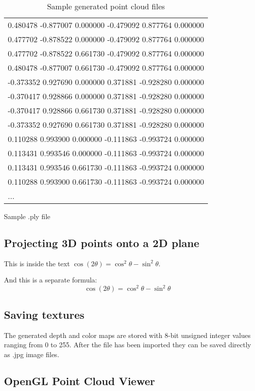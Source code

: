 \begin{table}[h]
\begin{subtable}[b]{0.52\textwidth}
{\begin{tabular}{l}
			0.480478 -0.877007 0.000000 -0.479092 0.877764 0.000000 \\
			0.477702 -0.878522 0.000000 -0.479092 0.877764 0.000000 \\
			0.477702 -0.878522 0.661730 -0.479092 0.877764 0.000000 \\
			0.480478 -0.877007 0.661730 -0.479092 0.877764 0.000000 \\
			-0.373352 0.927690 0.000000 0.371881 -0.928280 0.000000 \\
			-0.370417 0.928866 0.000000 0.371881 -0.928280 0.000000 \\
			-0.370417 0.928866 0.661730 0.371881 -0.928280 0.000000 \\
			-0.373352 0.927690 0.661730 0.371881 -0.928280 0.000000 \\
			0.110288 0.993900 0.000000 -0.111863 -0.993724 0.000000 \\
			0.113431 0.993546 0.000000 -0.111863 -0.993724 0.000000 \\
			0.113431 0.993546 0.661730 -0.111863 -0.993724 0.000000 \\
			0.110288 0.993900 0.661730 -0.111863 -0.993724 0.000000 \\
			...
			
		\end{tabular}}
		\caption{Sample .ply file}
		\label{tab:ply_file}
	\end{subtable}
	\caption{Sample generated point cloud files}
	\label{tab:xyz_ply_file_structure}
\end{table}


\subsection{Projecting 3D points onto a 2D plane}

This is inside the text $\cos (2\theta) = \cos^2 \theta - \sin^2 \theta$.


And this is a separate formula:
$$\cos (2\theta) = \cos^2 \theta - \sin^2 \theta$$


\subsection{Saving textures}

The generated depth and color maps are stored with 8-bit unsigned integer values ranging from 0 to 255. After the file has been imported they can be saved directly as .jpg image files.

\subsection{OpenGL Point Cloud Viewer}

